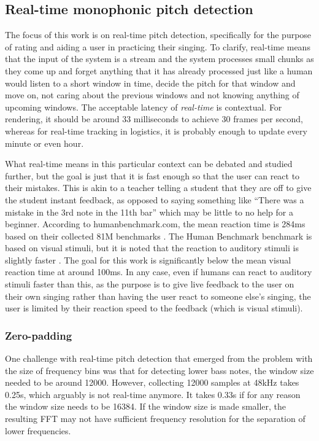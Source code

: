 \subsection{Real-time monophonic pitch detection}
The focus of this work is on real-time pitch detection, specifically for the purpose of rating and aiding a user in practicing their singing. To clarify, real-time means that the input of the system is a stream and the system processes small chunks as they come up and forget anything that it has already processed just like a human would listen to a short window in time, decide the pitch for that window and move on, not caring about the previous windows and not knowing anything of upcoming windows. The acceptable latency of \textit{real-time} is contextual. For rendering, it should be around 33 milliseconds to achieve 30 frames per second, whereas for real-time tracking in logistics, it is probably enough to update every minute or even hour. 

What real-time means in this particular context can be debated and studied further, but the goal is just that it is fast enough so that the user can react to their mistakes. This is akin to a teacher telling a student that they are off to give the student instant feedback, as opposed to saying something like “There was a mistake in the 3rd note in the 11th bar” which may be little to no help for a beginner. According to humanbenchmark.com, the mean reaction time is 284ms based on their collected 81M benchmarks \cite{HumanBenchmark2025}. The Human Benchmark benchmark is based on visual stimuli, but it is noted that the reaction to auditory stimuli is slightly faster \cite{SheltonKumar2010}. The goal for this work is significantly below the mean visual reaction time at around 100ms. In any case, even if humans can react to auditory stimuli faster than this, as the purpose is to give live feedback to the user on their own singing rather than having the user react to someone else's singing, the user is limited by their reaction speed to the feedback (which is visual stimuli).

\subsubsection{Zero-padding}
One challenge with real-time pitch detection that emerged from the problem with the size of frequency bins was that for detecting lower bass notes, the window size needed to be around 12000. However, collecting 12000 samples at 48kHz takes 0.25s, which arguably is not real-time anymore. It takes 0.33s if for any reason the window size needs to be 16384. If the window size is made smaller, the resulting FFT may not have sufficient frequency resolution for the separation of lower frequencies. 

